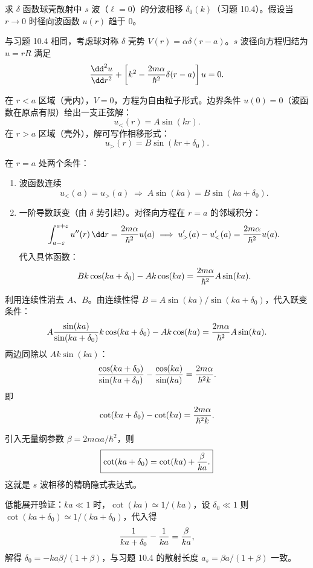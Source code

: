 \begin{question}
求 $\delta$ 函数球壳散射中 $s$ 波（$\ell=0$）的分波相移 $\delta_0(k)$（习题 10.4）。假设当 $r\to0$ 时径向波函数 $u(r)$ 趋于 0。
\end{question}
\begin{solution}
与习题 10.4 相同，考虑球对称 $\delta$ 壳势 $V(r)=\alpha\delta(r-a)$。$s$ 波径向方程归结为 $u=rR$ 满足
\[
{\dd^2u\over\dd r^2}+\left[k^2-{2m\alpha\over\hbar^2}\delta(r-a)\right]u=0.
\]

在 $r<a$ 区域（壳内），$V=0$，方程为自由粒子形式。边界条件 $u(0)=0$（波函数在原点有限）给出一支正弦解：
\[
u_{<}(r)=A\sin(kr).
\]
在 $r>a$ 区域（壳外），解可写作相移形式：
\[
u_{>}(r)=B\sin(kr+\delta_0).
\]

在 $r=a$ 处两个条件：
\begin{enumerate}
\item 波函数连续
\[
u_{<}(a)=u_{>}(a)\;\Longrightarrow\;A\sin(ka)=B\sin(ka+\delta_0).
\]
\item 一阶导数跃变（由 $\delta$ 势引起）。对径向方程在 $r=a$ 的邻域积分：
\[
\int_{a-\varepsilon}^{a+\varepsilon}u''(r)\,\dd r={2m\alpha\over\hbar^2}u(a)
\;\Longrightarrow\;
u_{>}'(a)-u_{<}'(a)={2m\alpha\over\hbar^2}u(a).
\]
代入具体函数：
\[
Bk\cos(ka+\delta_0)-Ak\cos(ka)={2m\alpha\over\hbar^2}A\sin(ka).
\]
\end{enumerate}

利用连续性消去 $A$、$B$。由连续性得 $B=A\sin(ka)/\sin(ka+\delta_0)$，代入跃变条件：
\[
A{\sin(ka)\over\sin(ka+\delta_0)}k\cos(ka+\delta_0)-Ak\cos(ka)={2m\alpha\over\hbar^2}A\sin(ka).
\]
两边同除以 $Ak\sin(ka)$：
\[
{\cos(ka+\delta_0)\over\sin(ka+\delta_0)}-{\cos(ka)\over\sin(ka)}={2m\alpha\over\hbar^2k}.
\]
即
\[
\cot(ka+\delta_0)-\cot(ka)={2m\alpha\over\hbar^2k}.
\]

引入无量纲参数 $\beta=2m\alpha a/\hbar^2$，则
\[
\boxed{\cot(ka+\delta_0)=\cot(ka)+{\beta\over ka}.}
\]
这就是 $s$ 波相移的精确隐式表达式。

低能展开验证：$ka\ll1$ 时，$\cot(ka)\simeq 1/(ka)$，设 $\delta_0\ll1$ 则 $\cot(ka+\delta_0)\simeq 1/(ka+\delta_0)$，代入得
\[
{1\over ka+\delta_0}-{1\over ka}={\beta\over ka},
\]
解得 $\delta_0=-ka\beta/(1+\beta)$，与习题 10.4 的散射长度 $a_s=\beta a/(1+\beta)$ 一致。
\end{solution}

